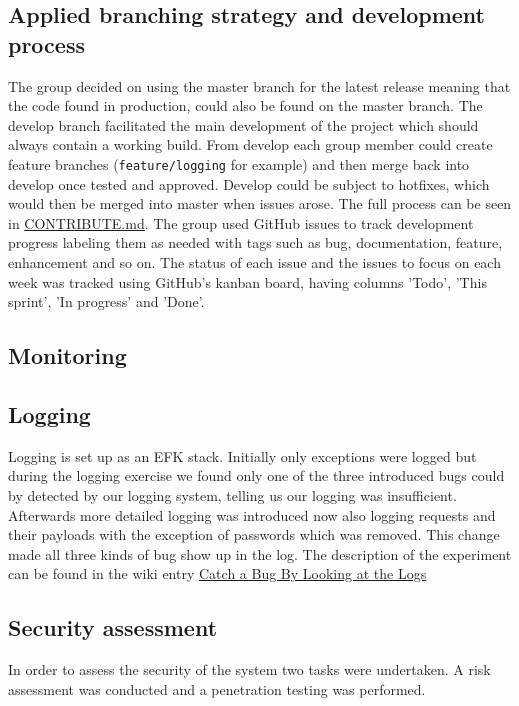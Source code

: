 
\subsection{Applied branching strategy and development process} %
The group decided on using the master branch for the latest release meaning that the code found in production, could also be found on the master branch. The develop branch facilitated the main development of the project which should always contain a working build. From develop each group member could create feature branches (\texttt{feature/logging} for example) and then merge back into develop once tested and approved. Develop could be subject to hotfixes, which would then be merged into master when issues arose. The full process can be seen in \underline{\href{https://github.com/DevOps2021-gb/devops2021/blob/main/CONTRIBUTE.md}{CONTRIBUTE.md}}. The group used GitHub issues to track development progress labeling them as needed with tags such as bug, documentation, feature, enhancement and so on. The status of each issue and the issues to focus on each week was tracked using GitHub's kanban board, having columns 'Todo', 'This sprint', 'In progress' and 'Done'.

\subsection{Monitoring} %

\subsection{Logging}
Logging is set up as an EFK stack. Initially only exceptions were logged but during the logging exercise we found only one of the three introduced bugs could by detected by our logging system, telling us our logging was insufficient. Afterwards more detailed logging was introduced now also logging requests and their payloads with the exception of passwords which was removed. This change made all three kinds of bug show up in the log. The description of the experiment can be found in the wiki entry \underline{\href{https://github.com/DevOps2021-gb/devops2021/wiki/Catch-a-Bug-By-Looking-at-the-Logs}{Catch a Bug By Looking at the Logs}} 

\subsection{Security assessment} %
In order to assess the security of the system two tasks were undertaken. A risk assessment was conducted and a penetration testing was performed.


